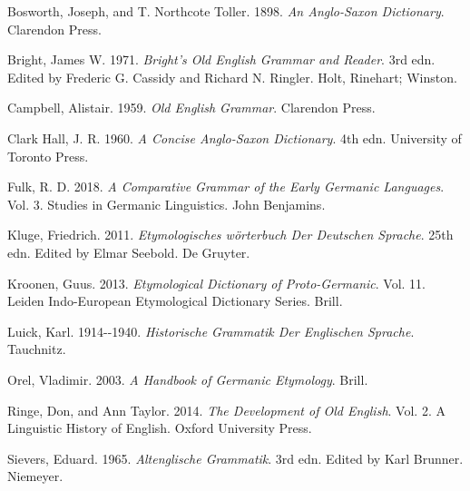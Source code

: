 \documentclass[
  british,
  a4paper,
]{article}
\newlength{\cslhangindent}
\newenvironment{CSLReferences}[2] %
 {\begin{list}{}{%
  \setlength{\itemindent}{0pt}
  \setlength{\leftmargin}{0pt}
  \setlength{\parsep}{0pt}
  \ifodd #1
   \setlength{\leftmargin}{\cslhangindent}
   \setlength{\itemindent}{-1\cslhangindent}
  \fi
  \setlength{\itemsep}{#2\baselineskip}}}
 {\end{list}}
\begin{document}
\protect{}\label{refs}
\begin{CSLReferences}{1}{1}
Bosworth, Joseph, and T. Northcote Toller. 1898. \emph{An {Anglo-Saxon}
Dictionary}. Clarendon Press.

Bright, James W. 1971. \emph{Bright's {Old English} Grammar and Reader}.
3rd edn. Edited by Frederic G. Cassidy and Richard N. Ringler. Holt,
Rinehart; Winston.

Campbell, Alistair. 1959. \emph{Old {English} Grammar}. Clarendon Press.

Clark Hall, J. R. 1960. \emph{A Concise {Anglo-Saxon} Dictionary}. 4th
edn. University of Toronto Press.

Fulk, R. D. 2018. \emph{A Comparative Grammar of the Early {Germanic}
Languages}. Vol. 3. Studies in Germanic Linguistics. John Benjamins.

Kluge, Friedrich. 2011. \emph{Etymologisches w{ö}rterbuch Der Deutschen
Sprache}. 25th edn. Edited by Elmar Seebold. De Gruyter.

Kroonen, Guus. 2013. \emph{Etymological Dictionary of {Proto-Germanic}}.
Vol. 11. Leiden Indo-European Etymological Dictionary Series. Brill.

Luick, Karl. 1914-\/-1940. \emph{Historische Grammatik Der Englischen
Sprache}. Tauchnitz.

Orel, Vladimir. 2003. \emph{A Handbook of {Germanic} Etymology}. Brill.

Ringe, Don, and Ann Taylor. 2014. \emph{The Development of {Old
English}}. Vol. 2. A Linguistic History of English. Oxford University
Press.

Sievers, Eduard. 1965. \emph{Altenglische Grammatik}. 3rd edn. Edited by
Karl Brunner. Niemeyer.

\end{CSLReferences}
\end{document}
